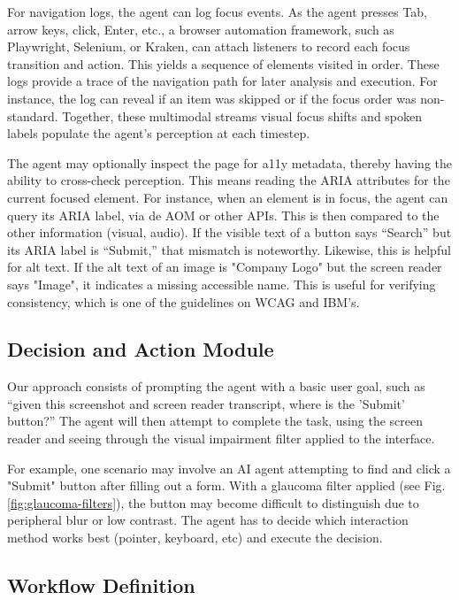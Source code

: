 For navigation logs, the agent can log focus events. As the agent presses Tab, arrow keys, click, Enter, etc., a browser automation framework, such as Playwright\cite{playwright2025}, Selenium\cite{garcia2024selenium}, or Kraken\cite{ravelo2023kraken}, can attach listeners to record each focus transition and action. This yields a sequence of elements visited in order\cite{ravelo2023kraken}. 
These logs provide a trace of the navigation path for later analysis and execution. For instance, the log can reveal if an item was skipped or if the focus order was non-standard. Together, these multimodal streams visual focus shifts and spoken labels populate the agent's perception at each timestep. 

The agent may optionally inspect the page for \ac{a11y} metadata, thereby having the ability to cross-check perception. This means reading the ARIA attributes for the current focused element. For instance, when an element is in focus, the agent can query its ARIA label, via de \ac{AOM} or other APIs. This is then compared to the other information (visual, audio). If the visible text of a button says “Search” but its ARIA label is “Submit,” that mismatch is noteworthy. Likewise, this is helpful for alt text. If the alt text of an image is "Company Logo" but the screen reader says "Image", it indicates a missing accessible name. This is useful for verifying consistency, which is one of the guidelines on \ac{WCAG} and IBM's\cite{ibm2025accessibility}. 

\subsection{Decision and Action Module}

Our approach consists of prompting the agent with a basic user goal, such as “given this screenshot and screen reader transcript, where is the 'Submit' button?” The agent will then attempt to complete the task, using the screen reader and seeing through the visual impairment filter applied to the interface.

For example, one scenario may involve an \ac{AI} agent attempting to find and click a "Submit" button after filling out a form. With a glaucoma filter applied (see Fig. \ref{fig:glaucoma-filters}), the button may become difficult to distinguish due to peripheral blur or low contrast. The agent has to decide which interaction method works best (pointer, keyboard, etc) and execute the decision.

\subsection{Workflow Definition}

